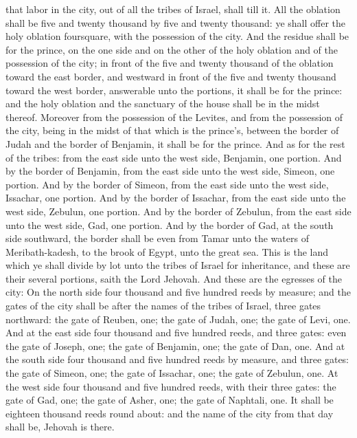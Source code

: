 that labor in the city, out of all the tribes of Israel, shall till it. All the oblation shall be five and twenty thousand by five and twenty thousand: ye shall offer the holy oblation foursquare, with the possession of the city.  And the residue shall be for the prince, on the one side and on the other of the holy oblation and of the possession of the city; in front of the five and twenty thousand of the oblation toward the east border, and westward in front of the five and twenty thousand toward the west border, answerable unto the portions, it shall be for the prince: and the holy oblation and the sanctuary of the house shall be in the midst thereof. Moreover from the possession of the Levites, and from the possession of the city, being in the midst of that which is the prince’s, between the border of Judah and the border of Benjamin, it shall be for the prince.  And as for the rest of the tribes: from the east side unto the west side, Benjamin, one portion. And by the border of Benjamin, from the east side unto the west side, Simeon, one portion. And by the border of Simeon, from the east side unto the west side, Issachar, one portion. And by the border of Issachar, from the east side unto the west side, Zebulun, one portion. And by the border of Zebulun, from the east side unto the west side, Gad, one portion. And by the border of Gad, at the south side southward, the border shall be even from Tamar unto the waters of Meribath-kadesh, to the brook of Egypt, unto the great sea. This is the land which ye shall divide by lot unto the tribes of Israel for inheritance, and these are their several portions, saith the Lord Jehovah.  And these are the egresses of the city: On the north side four thousand and five hundred reeds by measure; and the gates of the city shall be after the names of the tribes of Israel, three gates northward: the gate of Reuben, one; the gate of Judah, one; the gate of Levi, one. And at the east side four thousand and five hundred reeds, and three gates: even the gate of Joseph, one; the gate of Benjamin, one; the gate of Dan, one. And at the south side four thousand and five hundred reeds by measure, and three gates: the gate of Simeon, one; the gate of Issachar, one; the gate of Zebulun, one. At the west side four thousand and five hundred reeds, with their three gates: the gate of Gad, one; the gate of Asher, one; the gate of Naphtali, one. It shall be eighteen thousand reeds round about: and the name of the city from that day shall be, Jehovah is there. 